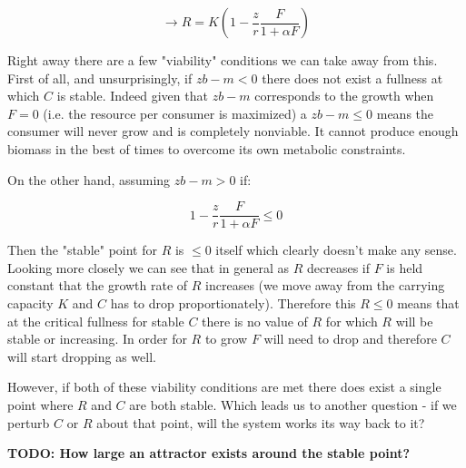 \documentclass[11pt,a5paper]{book}
\begin{document}
$$\rightarrow R = K\left( 1 - \frac{z}{r}\frac{F}{1+\alpha F} \right)$$

Right away there are a few "viability" conditions we can take away from this. First of all, and unsurprisingly, if $zb-m<0$ there does not exist a fullness at which $C$ is stable. Indeed given that $zb-m$ corresponds to the growth when $F=0$ (i.e. the resource per consumer is maximized) a $zb-m\leq 0 $ means the consumer will never grow and is completely nonviable. It cannot produce enough biomass in the best of times to overcome its own metabolic constraints. 

On the other hand, assuming $zb-m>0$ if: 

$$ 1 - \frac{z}{r}\frac{F}{1+\alpha F} \leq 0$$

Then the "stable" point for $R$ is $\leq 0$ itself which clearly doesn't make any sense. Looking more closely we can see that in general as $R$ decreases if $F$ is held constant that the growth rate of $R$ increases (we move away from the carrying capacity $K$ and $C$ has to drop proportionately). Therefore this $R\leq 0 $ means that at the critical fullness for stable $C$ there is no value of $R$ for which $R$ will be stable or increasing. In order for $R$ to grow $F$ will need to drop and therefore $C$ will start dropping as well. 
\newline

However, if both of these viability conditions are met there does exist a single point where $R$ and $C$ are both stable. Which leads us to another question - if we perturb $C$ or $R$ about that point, will the system works its way back to it? 


\textbf{TODO: How large an attractor exists around the stable point?}
\end{document}
